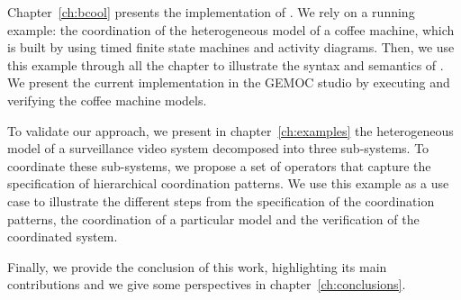 Chapter~\ref{ch:bcool} presents the implementation of \bcool. We rely on a running example: the coordination of the heterogeneous model of a coffee machine, which is built by using timed finite state machines and activity diagrams. Then, we use this example through all the chapter to illustrate the syntax and semantics of \bcool. We present the current implementation in the GEMOC studio by executing and verifying the coffee machine models. 

To validate our approach, we present in chapter~\ref{ch:examples} the heterogeneous model of a surveillance video system decomposed into three sub-systems. To coordinate these sub-systems, we propose a set of \bcool operators that capture the specification of hierarchical coordination patterns. We use this example as a use case to illustrate the different steps from the specification of the coordination patterns, the coordination of a particular model and the verification of the coordinated system.     

Finally, we provide the conclusion of this work, highlighting its main contributions and we give some perspectives in chapter~\ref{ch:conclusions}.

	
	







